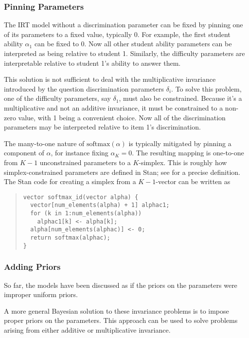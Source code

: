 \subsubsection{Pinning Parameters}

The IRT model without a discrimination parameter can be fixed by
pinning one of its parameters to a fixed value, typically 0.  For
example, the first student ability $\alpha_1$ can be fixed to 0.  Now
all other student ability parameters can be interpreted as being
relative to student 1.  Similarly, the difficulty parameters are
interpretable relative to student 1's ability to answer them.

This solution is not sufficient to deal with the multiplicative
invariance introduced by the question discrimination parameters
$\delta_i$.  To solve this problem, one of the difficulty parameters,
say $\delta_1$, must also be constrained.  Because it's a
multiplicative and not an additive invariance, it must be constrained
to a non-zero value, with 1 being a convenient choice.  Now all of the
discrimination parameters may be interpreted relative to item 1's
discrimination.

The many-to-one nature of $\mbox{softmax}(\alpha)$ is typically
mitigated by pinning a component of $\alpha$, for instance fixing
$\alpha_K = 0$.  The resulting mapping is one-to-one from $K-1$
unconstrained parameters to a $K$-simplex.  This is roughly how
simplex-constrained parameters are defined in Stan; see
 for a precise definition.  The Stan
code for creating a simplex from a $K-1$-vector can be written as
%
\begin{quote}
\begin{Verbatim}
vector softmax_id(vector alpha) {
  vector[num_elements(alpha) + 1] alphac1;
  for (k in 1:num_elements(alpha))
    alphac1[k] <- alpha[k];
  alpha[num_elements(alphac)] <- 0;
  return softmax(alphac);
}
\end{Verbatim}
\end{quote}




\subsubsection{Adding Priors}

So far, the models have been discussed as if the priors on the
parameters were improper uniform priors.  

A more general Bayesian solution to these invariance problems is to
impose proper priors on the parameters.  This approach can be used to
solve problems arising from either additive or multiplicative
invariance.


